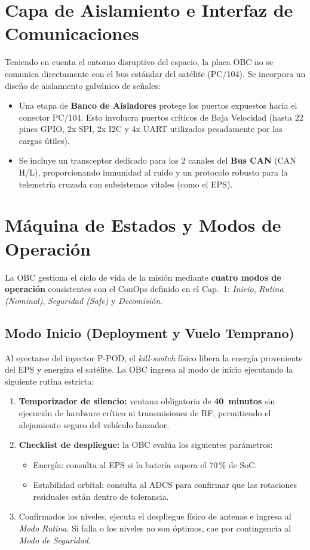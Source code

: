 \section{Capa de Aislamiento e Interfaz de Comunicaciones}
Teniendo en cuenta el entorno disruptivo del espacio, la placa OBC no se comunica directamente con el bus estándar del satélite (PC/104). Se incorpora un diseño de aislamiento galvánico de señales:
\begin{itemize}
    \item Una etapa de \textbf{Banco de Aisladores} protege los puertos expuestos hacia el conector PC/104. Esto involucra puertos críticos de Baja Velocidad (hasta 22 pines GPIO, 2x SPI, 2x I2C y 4x UART utilizados pesadamente por las cargas útiles).
    \item Se incluye un transceptor dedicado para los 2 canales del \textbf{Bus CAN} (CAN H/L), proporcionando inmunidad al ruido y un protocolo robusto para la telemetría cruzada con subsistemas vitales (como el EPS).
\end{itemize}

\section{Máquina de Estados y Modos de Operación}
La OBC gestiona el ciclo de vida de la misión mediante \textbf{cuatro modos de operación} consistentes con el ConOps definido en el Cap.~1: \textit{Inicio}, \textit{Rutina (Nominal)}, \textit{Seguridad (Safe)} y \textit{Decomisión}.

\subsection{Modo Inicio (Deployment y Vuelo Temprano)}
Al eyectarse del inyector P-POD, el \textit{kill-switch} físico libera la energía proveniente del EPS y energiza el satélite. La OBC ingresa al modo de inicio ejecutando la siguiente rutina estricta:
\begin{enumerate}
    \item \textbf{Temporizador de silencio:} ventana obligatoria de \textbf{40~minutos} sin ejecución de hardware crítico ni transmisiones de RF, permitiendo el alejamiento seguro del vehículo lanzador.
    \item \textbf{Checklist de despliegue:} la OBC evalúa los siguientes parámetros:
    \begin{itemize}
        \item Energía: consulta al EPS si la batería supera el 70\,\% de SoC.
        \item Estabilidad orbital: consulta al ADCS para confirmar que las rotaciones residuales están dentro de tolerancia.
    \end{itemize}
    \item Confirmados los niveles, ejecuta el despliegue físico de antenas e ingresa al \textit{Modo Rutina}. Si falla o los niveles no son óptimos, cae por contingencia al \textit{Modo de Seguridad}.
\end{enumerate}

